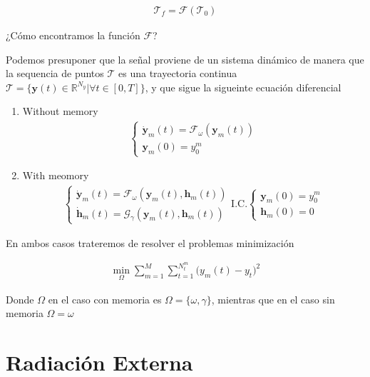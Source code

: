 \begin{gather}
    \mathcal{T}_f = \mathcal{F}(\mathcal{T}_0) 
\end{gather}

¿Cómo encontramos la función $\mathcal{F}$?


Podemos presuponer que la señal proviene de un sistema dinámico de manera que la sequencia de puntos $\mathcal{T}$ es una trayectoria continua $\mathcal{T} = \{\bm{y}(t) \in \mathbb{R}^{N_y}  |  \forall t \in [0,T]\}$, y que sigue la sigueinte ecuación diferencial 

\begin{enumerate}
    \item Without memory
     \begin{gather}
        \begin{cases}
            \dot{\bm{y}}_m(t) = \mathcal{F}_\omega(\bm{y}_m(t)) \\
            \bm{y}_m(0) = y_0^m 
        \end{cases}
    \end{gather}

    \item With meomory
     \begin{gather}
        \begin{cases}
            \dot{\bm{y}}_m(t) = \mathcal{F}_\omega(\bm{y}_m(t),\bm{h}_m(t)) \\
            \dot{\bm{h}}_m(t) = \mathcal{G}_\gamma(\bm{y}_m(t),\bm{h}_m(t)) 
        \end{cases}
        \text{I.C.}
        \begin{cases}
            \bm{y}_m(0) = y_0^m \\
            \bm{h}_m(0) = 0
        \end{cases}    
    \end{gather}
\end{enumerate}


En ambos casos trateremos de resolver el problemas minimización

\begin{gather}
    \min_{\Omega} \sum_{m=1}^{M} \sum_{t=1}^{N_t^m}\Big(  y_m(t) - y_t\Big)^2
\end{gather}

Donde $\Omega$ en el caso con memoria es $\Omega = \{\omega,\gamma\}$, mientras que en el caso sin memoria $\Omega = \omega$


\section{Radiación Externa}

